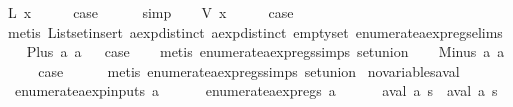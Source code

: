 \begin{isabellebody}
\ {\isacharparenleft}L\ x{\isacharparenright}\isanewline
\ \ \isamarkupfalse%
\ \isamarkupfalse%
\ {\isacharquery}case\isanewline
\ \ \ \ \isamarkupfalse%
\ simp\isanewline
{}\isamarkupfalse%
\isanewline
\ \ \isamarkupfalse%
\ {\isacharparenleft}V\ x{\isacharparenright}\isanewline
\ \ \isamarkupfalse%
\ \isamarkupfalse%
\ {\isacharquery}case\isanewline
\ \ \ \ \isamarkupfalse%
\ {\isacharparenleft}metis\ List{\isachardot}set{\isacharunderscore}insert\ aexp{\isachardot}distinct{\isacharparenleft}{}{\isacharparenright}\ aexp{\isachardot}distinct{\isacharparenleft}{}{\isacharparenright}\ empty{\isacharunderscore}set\ enumerate{\isacharunderscore}aexp{\isacharunderscore}regs{\isachardot}elims{\isacharparenright}\isanewline
{}\isamarkupfalse%
\isanewline
\ \ \isamarkupfalse%
\ {\isacharparenleft}Plus\ a{}\ a{}{\isacharparenright}\isanewline
{}\isamarkupfalse%
\ \isamarkupfalse%
\ {\isacharquery}case\isanewline
\ \ \isamarkupfalse%
\ {\isacharparenleft}metis\ enumerate{\isacharunderscore}aexp{\isacharunderscore}regs{\isachardot}simps{\isacharparenleft}{}{\isacharparenright}\ set{\isacharunderscore}union{\isacharparenright}\isanewline
{}\isamarkupfalse%
\isanewline
\ \ \isamarkupfalse%
\ {\isacharparenleft}Minus\ a{}\ a{}{\isacharparenright}\isanewline
\ \ \isamarkupfalse%
\ \isamarkupfalse%
\ {\isacharquery}case\isanewline
\ \ \ \ \isamarkupfalse%
\ {\isacharparenleft}metis\ enumerate{\isacharunderscore}aexp{\isacharunderscore}regs{\isachardot}simps{\isacharparenleft}{}{\isacharparenright}\ set{\isacharunderscore}union{\isacharparenright}\isanewline
{}\isamarkupfalse%
%
\endisatagproof
{\isafoldproof}%
%
\isadelimproof
\isanewline
%
\endisadelimproof
\isanewline
{}\isamarkupfalse%
\ no{\isacharunderscore}variables{\isacharunderscore}aval{\isacharcolon}\isanewline
\ \ {\isachardoublequoteopen}enumerate{\isacharunderscore}aexp{\isacharunderscore}inputs\ a\ {\isacharequal}\ {\isacharbraceleft}{\isacharbraceright}\ {\isasymLongrightarrow}\isanewline
\ \ \ enumerate{\isacharunderscore}aexp{\isacharunderscore}regs\ a\ {\isacharequal}\ {\isacharbraceleft}{\isacharbraceright}\ {\isasymLongrightarrow}\isanewline
\ \ \ aval\ a\ s\ {\isacharequal}\ aval\ a\ s{\isacharprime}{\isachardoublequoteclose}\isanewline

\end{isabellebody}
